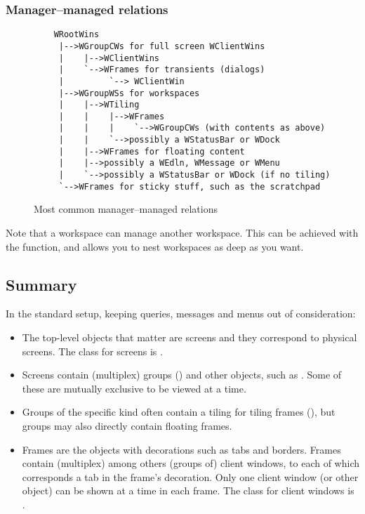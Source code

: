 \subsubsection{Manager--managed relations}

\begin{figure}
\begin{htmlonly}
\docode %
\end{htmlonly}
\begin{verbatim}
    WRootWins
     |-->WGroupCWs for full screen WClientWins
     |    |-->WClientWins
     |    `-->WFrames for transients (dialogs)
     |         `--> WClientWin
     |-->WGroupWSs for workspaces
     |    |-->WTiling
     |    |    |-->WFrames
     |    |    |    `-->WGroupCWs (with contents as above)
     |    |    `-->possibly a WStatusBar or WDock
     |    |-->WFrames for floating content
     |    |-->possibly a WEdln, WMessage or WMenu
     |    `-->possibly a WStatusBar or WDock (if no tiling)
     `-->WFrames for sticky stuff, such as the scratchpad
\end{verbatim}
\caption{Most common manager--managed relations}
\label{fig:managership}
\end{figure}

Note that a workspace can manage another workspace. This can be
achieved with the  function, and allows you to nest
workspaces as deep as you want.


\subsection{Summary}

In the standard setup, keeping queries, messages and menus out of
consideration:

\begin{itemize}
  \item The top-level objects that matter are screens and they correspond
    to physical screens. The class for screens is .
  \item Screens contain (multiplex) groups () and other 
    objects, such as . Some of these are mutually exclusive
    to be viewed at a time.
  \item Groups of the specific kind  often contain a
     tiling for tiling frames (), but 
    groups may also directly contain floating frames.
  \item Frames are the objects with decorations such as tabs and borders.
    Frames contain (multiplex) among others (groups of) client windows, 
    to each of which corresponds a tab in the frame's decoration. Only 
    one client window (or other object) can be shown at a time in each 
    frame. The class for client windows is .
\end{itemize}

